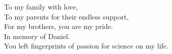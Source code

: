 \begin{dedication}
    To my family with love,\\
    To my parents for their endless support,\\
    For my brothers, you are my pride.\\
    \vspace{12pt}
    In memory of Daniel.\\
    You left fingerprints of passion for science on my life.
\end{dedication}

\cleardoublepage